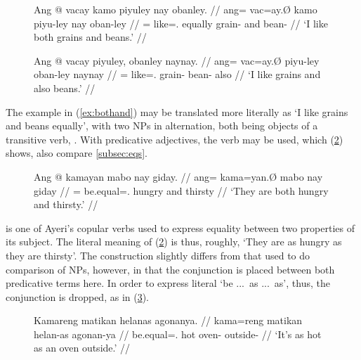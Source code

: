 \begin{figure}[h]
\pex
\a\label{ex:bothand}\begingl
	\gla Ang @ vacay kamo piyuley nay obanley. //
	\glb ang= vac=ay.Ø kamo piyu-ley nay oban-ley //
	\glc \AgtT{}= like=\Fsg{}.\Top{} equally grain-\PargI{} and
		bean-\PargI{} //
	\glft `I like both grains and beans.' //
\endgl

\a\label{ex:andaswell}\begingl
	\gla Ang @ vacay piyuley, obanley naynay. //
	\glb ang= vac=ay.Ø piyu-ley oban-ley naynay //
	\glc \AgtT{}= like=\Fsg{}.\Top{} grain-\PargI{} bean-\PargI{} also //
	\glft `I like grains and also beans.' //
\endgl
\xe
\end{figure}

The example in (\ref{ex:bothand}) may be translated more literally as `I like
grains and beans equally', with two NPs in alternation, both being objects of a
transitive verb, . With predicative adjectives, the
verb  may be used, which (\ref{ex:bothandpred})
shows, also compare \autoref{subsec:eqs}.

\begin{figure}[h]
\ex\label{ex:bothandpred}
\begingl
	\gla Ang @ kamayan mabo nay giday. //
	\glb ang= kama=yan.Ø mabo nay giday //
	\glc \AgtT{}= be.equal=\TplM{}.\Top{} hungry and thirsty //
	\glft `They are both hungry and thirsty.' //
\endgl
\xe
\end{figure}

 is one of Ayeri's copular verbs used to express equality 
between two properties of its subject. The literal meaning of
(\ref{ex:bothandpred}) is thus, roughly, `They are as hungry as they are
thirsty'. The construction slightly differs from that used to do comparison of
NPs, however, in that the conjunction  is placed between both
predicative terms here. In order to express literal `be ...\ as ...\ as', thus,
the conjunction is dropped, as in (\ref{ex:asas}).

\begin{figure}[h]
\ex\label{ex:asas}
\begingl
	\gla Kamareng matikan helanas agonanya. //
	\glb kama=reng matikan helan-as agonan-ya //
	\glc be.equal=\TsgI{}.\Aarg{} hot oven-\Parg{} outside-\Loc{} //
	\glft `It's as hot as an oven outside.' //
\endgl
\xe
\end{figure}


